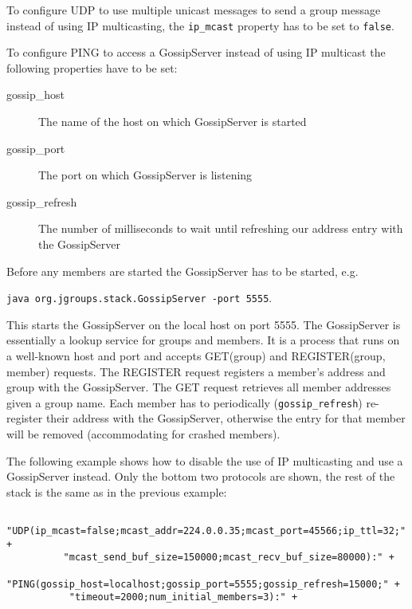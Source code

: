       To configure UDP to use multiple unicast messages to send a group message
      instead of using IP multicasting, the {\tt ip\_mcast} property has to be set to
      {\tt false}.

      To configure PING to access a GossipServer instead of using IP multicast the
      following properties have to be set:

      \begin{description}
      \item[gossip\_host] The name of the host on which GossipServer is started
      \item[gossip\_port] The port on which GossipServer is listening
      \item[gossip\_refresh] The number of milliseconds to wait until refreshing our
                             address entry with the GossipServer
      \end{description}

      Before any members are started the GossipServer has to be started, e.g.

      {\tt java org.jgroups.stack.GossipServer -port 5555}.

      This starts the GossipServer on the local host on port 5555. The GossipServer
      is essentially a lookup service for groups and members. It is a process that
      runs on a well-known host and port and accepts GET(group) and REGISTER(group,
      member) requests. The REGISTER request registers a member's address and group
      with the GossipServer. The GET request retrieves all member addresses given a
      group name. Each member has to periodically ({\tt gossip\_refresh}) re-register
      their address with the GossipServer, otherwise the entry for that member will be
      removed (accommodating for crashed members).

      The following example shows how to disable the use of IP multicasting and use a
      GossipServer instead. Only the bottom two protocols are shown, the rest of the
      stack is the same as in the previous example:

      \begin{small}
      \begin{verbatim}
      "UDP(ip_mcast=false;mcast_addr=224.0.0.35;mcast_port=45566;ip_ttl=32;" +
          "mcast_send_buf_size=150000;mcast_recv_buf_size=80000):" +
      "PING(gossip_host=localhost;gossip_port=5555;gossip_refresh=15000;" +
           "timeout=2000;num_initial_members=3):" +
      \end{verbatim}
      \end{small}


